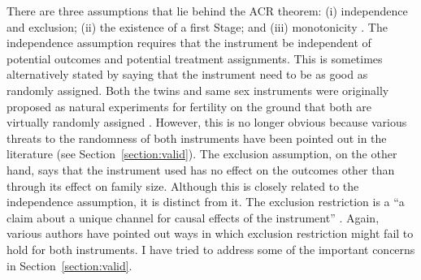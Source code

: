 There are three assumptions that lie behind the ACR theorem: (i) independence and exclusion; (ii) the existence of a first Stage; and (iii) monotonicity \parencite{Angrist2009}. The independence assumption requires that the instrument be independent of potential outcomes and potential treatment assignments. This is sometimes alternatively stated by saying that the instrument need to be as good as randomly assigned. Both the twins and same sex instruments were originally proposed as natural experiments for fertility on the ground that both are virtually randomly assigned \parencite{rosenzweig_testing_1980,angrist_children_1998}. However, this is no longer obvious because various threats to the randomness of both instruments have been pointed out in the literature (see Section~\ref{section:valid}). The exclusion assumption, on the other hand, says that the instrument used has no effect on the outcomes other than through its effect on family size.  Although this is closely related to the independence assumption, it is distinct from it. The exclusion restriction is a \enquote{a claim about a unique channel for causal effects of the instrument} \parencite[p.~153]{Angrist2009}. Again, various authors have pointed out ways in which exclusion restriction might fail to hold for both instruments. I have tried to address some of the important concerns in Section~\ref{section:valid}. 


